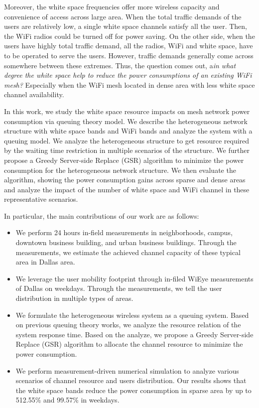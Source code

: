 Moreover, the white space frequencies offer more wireless capacity and convenience of access across large 
area. When the total traffic demands of the users are relatively low, a single white space channels satisfy 
all the user. Then, the WiFi radios could be turned off for power saving. On the other side, when the users 
have highly total traffic demand, all the radios, WiFi and white space, have to be operated to serve the users. 
However, traffic demands generally come across somewhere between these extremes. Thus, the question comes out, 
a{\it in what degree the white space help to reduce the power consumptions of an existing WiFi mesh?}
Especially when the WiFi mesh located in dense area with less white space channel availability.

In this work, we study the white space resource impacts on mesh network power consumption via queuing theory model.
We describe the heterogeneous network structure with white space bands and WiFi bands and analyze the 
system with a queuing model. We analyze the heterogeneous structure to get resource required by the waiting 
time restriction in multiple scenarios of the structure. We further propose a Greedy Server-side Replace (GSR) 
algorithm to minimize the power consumption for the heterogeneous network structure. 
We then evaluate the algorithm, showing the power consumption gains across sparse and dense areas and 
analyze the impact of the number of white space and WiFi channel in these representative scenarios.

In particular, the main contributions of our work are as follows:
\begin{itemize}
\item We perform 24 hours in-field measurements in neighborhoods, campus, downtown business building, 
and urban business buildings. Through the measurements, we estimate the achieved channel capacity of 
these typical area in Dallas area.
\item We leverage the user mobility footprint through in-filed WiEye measurements of Dallas on weekdays. 
Through the measurements, we tell the user distribution in multiple types of areas. 
\item 
We formulate the heterogeneous wireless system as a queuing system. Based on previous queuing theory works, we 
analyze the resource relation of the system response time. Based on the analyze, we propose a Greedy Server-side Replace 
(GSR) algorithm to allocate the channel resource to minimize the power consumption.
\item We perform measurement-driven numerical simulation to analyze various scenarios of channel resource and 
users distribution. Our results shows that the white space bands reduce the power consumption in
sparse area by up to 512.55\% and 99.57\% in weekdays.
\end{itemize}


